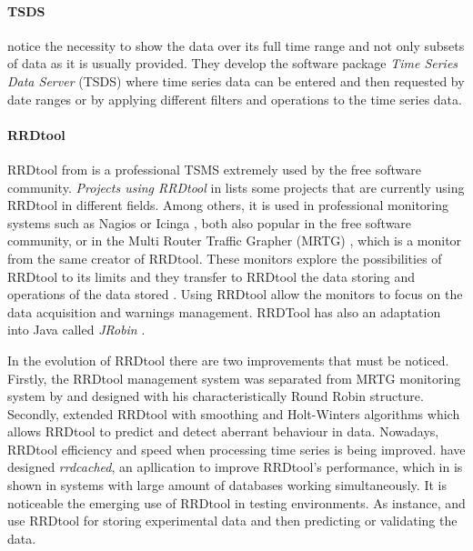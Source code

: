 \paragraph{TSDS} \textcite{weigel10} notice the necessity to show the data over its full time range and not only subsets of data as it is usually provided. 
They develop  the software package \emph{Time Series Data Server} (TSDS) \parencite{tsds} where time series data can be entered and then requested by date ranges or by applying different filters and operations to the time series data.


\paragraph{RRDtool} RRDtool from \textcite{rrdtool} is a professional TSMS extremely used by the free software community. \emph{Projects using RRDtool} in \cite{rrdtool} lists some projects that are currently using RRDtool in different fields. Among others, it is used in professional monitoring systems such as Nagios \parencite{nagios} or Icinga \parencite{icinga}, both also popular in the free software community, or  in the Multi Router Traffic Grapher (MRTG) \parencite{mrtg}, which is a monitor from the same creator of RRDtool. 
These monitors explore the possibilities of RRDtool to its limits and they transfer to RRDtool the data storing and operations of the data stored . 
Using RRDtool allow the monitors to focus on the data acquisition and warnings management. RRDTool has also an adaptation into Java called \emph{JRobin} \parencite{jrobin}.


In the evolution of RRDtool there are two improvements that must be noticed.
Firstly, the RRDtool management system was separated from MRTG monitoring system by \textcite{lisa98:oetiker} and designed with his characteristically Round Robin structure. Secondly, \textcite{lisa00:brutlag} extended RRDtool with smoothing and Holt-Winters algorithms which allows RRDtool to predict and detect aberrant behaviour in data.  
Nowadays, RRDtool efficiency and speed when processing time series is being improved. \textcite{carder:rrdcached} have designed \emph{rrdcached}, an apllication to improve RRDtool's performance, which in \cite{lisa07:plonka} is shown  in systems with large amount of databases working simultaneously.
It is noticeable the emerging use of RRDtool in testing environments. As instance, \textcite{zhang07} and \textcite{chilingaryan10} use RRDtool for storing experimental data and then predicting or validating the data.


